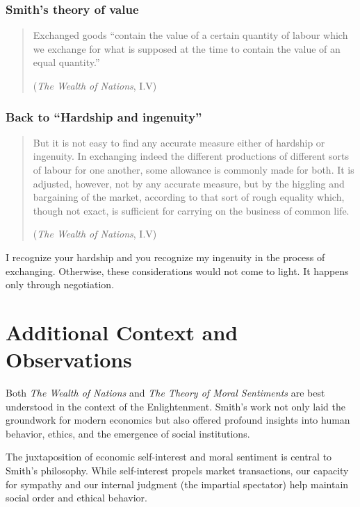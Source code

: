 \subsubsection{Smith’s theory of value}

\begin{quote}
Exchanged goods “contain the value of a certain quantity of labour which we exchange for what is supposed at the time to contain the value of an equal quantity.”

(\textit{The Wealth of Nations}, I.V)
\end{quote}

\subsubsection{Back to “Hardship and ingenuity”}

\begin{quote}
But it is not easy to find any accurate measure either of hardship or ingenuity. In exchanging indeed the different productions of different sorts of labour for one another, some allowance is commonly made for both. It is adjusted, however, not by any accurate measure, but by the higgling and bargaining of the market, according to that sort of rough equality which, though not exact, is sufficient for carrying on the business of common life.

(\textit{The Wealth of Nations}, I.V)
\end{quote}

\begin{remark}
I recognize your hardship and you recognize my ingenuity in the process of exchanging. Otherwise, these considerations would not come to light. It happens only through negotiation.
\end{remark}

\section*{Additional Context and Observations}

\begin{remark}
Both \textit{The Wealth of Nations} and \textit{The Theory of Moral Sentiments} are best understood in the context of the Enlightenment. Smith’s work not only laid the groundwork for modern economics but also offered profound insights into human behavior, ethics, and the emergence of social institutions.
\end{remark}

\begin{remark}
The juxtaposition of economic self-interest and moral sentiment is central to Smith’s philosophy. While self-interest propels market transactions, our capacity for sympathy and our internal judgment (the impartial spectator) help maintain social order and ethical behavior.
\end{remark}

